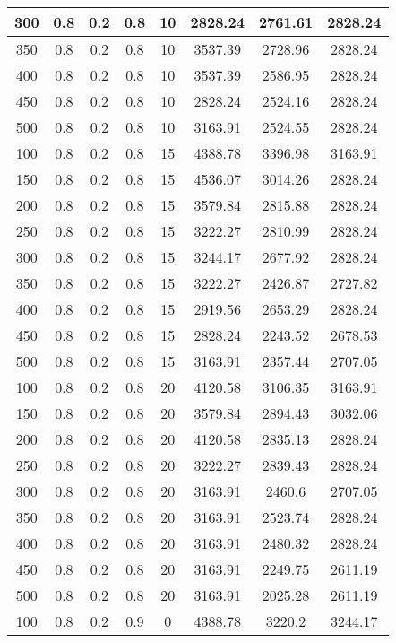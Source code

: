 \documentclass[a4paper, 12pt]{extreport}
\begin{document}
\begin{itemize}
\begin{longtable}{|c|c|c|c|c|c|c|c|}
			300 & 0.8 & 0.2 & 0.8 & 10 & 2828.24 & 2761.61 & 2828.24 \\\hline
			350 & 0.8 & 0.2 & 0.8 & 10 & 3537.39 & 2728.96 & 2828.24 \\\hline
			400 & 0.8 & 0.2 & 0.8 & 10 & 3537.39 & 2586.95 & 2828.24 \\\hline
			450 & 0.8 & 0.2 & 0.8 & 10 & 2828.24 & 2524.16 & 2828.24 \\\hline
			500 & 0.8 & 0.2 & 0.8 & 10 & 3163.91 & 2524.55 & 2828.24 \\\hline
			100 & 0.8 & 0.2 & 0.8 & 15 & 4388.78 & 3396.98 & 3163.91 \\\hline
			150 & 0.8 & 0.2 & 0.8 & 15 & 4536.07 & 3014.26 & 2828.24 \\\hline
			200 & 0.8 & 0.2 & 0.8 & 15 & 3579.84 & 2815.88 & 2828.24 \\\hline
			250 & 0.8 & 0.2 & 0.8 & 15 & 3222.27 & 2810.99 & 2828.24 \\\hline
			300 & 0.8 & 0.2 & 0.8 & 15 & 3244.17 & 2677.92 & 2828.24 \\\hline
			350 & 0.8 & 0.2 & 0.8 & 15 & 3222.27 & 2426.87 & 2727.82 \\\hline
			400 & 0.8 & 0.2 & 0.8 & 15 & 2919.56 & 2653.29 & 2828.24 \\\hline
			450 & 0.8 & 0.2 & 0.8 & 15 & 2828.24 & 2243.52 & 2678.53 \\\hline
			500 & 0.8 & 0.2 & 0.8 & 15 & 3163.91 & 2357.44 & 2707.05 \\\hline
			100 & 0.8 & 0.2 & 0.8 & 20 & 4120.58 & 3106.35 & 3163.91 \\\hline
			150 & 0.8 & 0.2 & 0.8 & 20 & 3579.84 & 2894.43 & 3032.06 \\\hline
			200 & 0.8 & 0.2 & 0.8 & 20 & 4120.58 & 2835.13 & 2828.24 \\\hline
			250 & 0.8 & 0.2 & 0.8 & 20 & 3222.27 & 2839.43 & 2828.24 \\\hline
			300 & 0.8 & 0.2 & 0.8 & 20 & 3163.91 & 2460.6 & 2707.05 \\\hline
			350 & 0.8 & 0.2 & 0.8 & 20 & 3163.91 & 2523.74 & 2828.24 \\\hline
			400 & 0.8 & 0.2 & 0.8 & 20 & 3163.91 & 2480.32 & 2828.24 \\\hline
			450 & 0.8 & 0.2 & 0.8 & 20 & 3163.91 & 2249.75 & 2611.19 \\\hline
			500 & 0.8 & 0.2 & 0.8 & 20 & 3163.91 & 2025.28 & 2611.19 \\\hline
			100 & 0.8 & 0.2 & 0.9 & 0 & 4388.78 & 3220.2 & 3244.17 \\\hline

\end{longtable}
\end{itemize}
\end{document}
